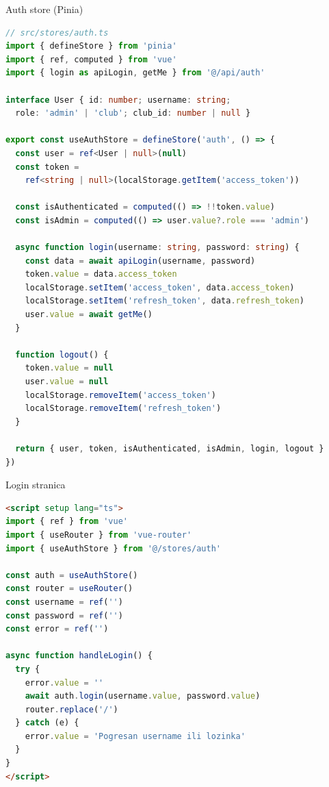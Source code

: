 \begin{frame}[fragile,shrink=5]{Auth store (Pinia)}
\begin{lstlisting}[language=typescript]
// src/stores/auth.ts
import { defineStore } from 'pinia'
import { ref, computed } from 'vue'
import { login as apiLogin, getMe } from '@/api/auth'

interface User { id: number; username: string;
  role: 'admin' | 'club'; club_id: number | null }

export const useAuthStore = defineStore('auth', () => {
  const user = ref<User | null>(null)
  const token =
    ref<string | null>(localStorage.getItem('access_token'))

  const isAuthenticated = computed(() => !!token.value)
  const isAdmin = computed(() => user.value?.role === 'admin')

  async function login(username: string, password: string) {
    const data = await apiLogin(username, password)
    token.value = data.access_token
    localStorage.setItem('access_token', data.access_token)
    localStorage.setItem('refresh_token', data.refresh_token)
    user.value = await getMe()
  }

  function logout() {
    token.value = null
    user.value = null
    localStorage.removeItem('access_token')
    localStorage.removeItem('refresh_token')
  }

  return { user, token, isAuthenticated, isAdmin, login, logout }
})
\end{lstlisting}
\end{frame}

\begin{frame}[fragile,shrink=5]{Login stranica}
\begin{lstlisting}[language=html]
<script setup lang="ts">
import { ref } from 'vue'
import { useRouter } from 'vue-router'
import { useAuthStore } from '@/stores/auth'

const auth = useAuthStore()
const router = useRouter()
const username = ref('')
const password = ref('')
const error = ref('')

async function handleLogin() {
  try {
    error.value = ''
    await auth.login(username.value, password.value)
    router.replace('/')
  } catch (e) {
    error.value = 'Pogresan username ili lozinka'
  }
}
</script>
\end{lstlisting}
\end{frame}

